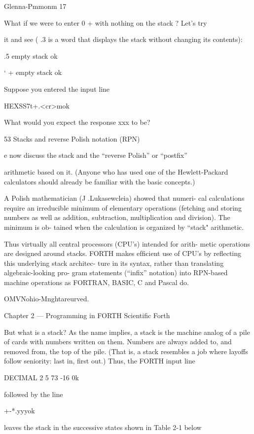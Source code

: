 Glenna-Pmmonm 17

What if we were to enter 0 + with nothing on the stack ? Let's try

it and see ( .3 is a word that displays the stack without changing
its contents):

.5 empty stack ok

‘ + empty stack ok

Suppose you entered the input line

HEXSS7t+.<cr>mok

What would you expect the response xxx to be?

53 Stacks and reverse Polish notation (RPN)

e now discuss the stack and the “reverse Polish” or “postﬁx”

arithmetic based on it. (Anyone who has used one of the
Hewlett-Packard calculators should already be familiar with the
basic concepts.)

A Polish mathematician (J .Lukasewcleia) showed that numeri-
cal calculations require an irreducible minimum of elementary
operations (fetching and storing numbers as well as addition,
subtraction, multiplication and division). The minimum is ob-
tained when the calculation is organized by “stack" arithmetic.

Thus virtually all central processors (CPU’s) intended for arith-
metic operations are designed around stacks. FORTH makes
efﬁcient use of CPU's by reflecting this underlying stack architec-
ture in its syntax, rather than translating algebraic-looking pro-
gram statements (“inﬁx” notation) into RPN-based machine
operations as FORTRAN, BASIC, C and Pascal do.

OMVNohio-Mnghtareurved.

Chapter 2 — Programming in FORTH Scientiﬁc Forth

But what is a stack? As the name implies, a stack is the machine
analog of a pile of cards with numbers written on them. Numbers
are always added to, and removed from, the top of the pile. (That
is, a stack resembles a job where layoffs follow seniority: last in,
ﬁrst out.) Thus, the FORTH input line

DECIMAL 2 5 73 -16 0k

followed by the line

+-*.yyyok

leaves the stack in the successive states shown in Table 2-1 below

 

 

